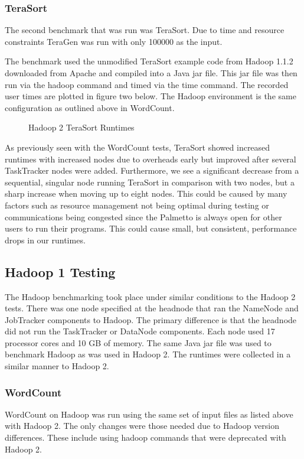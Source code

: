 \documentclass[conference]{IEEEtran}
\begin{document}
				\subsubsection{TeraSort}
					The second benchmark that was run was TeraSort. Due to time and resource constraints TeraGen was run with only 100000 as the input.

					The benchmark used the unmodified TeraSort example code from Hadoop 1.1.2 downloaded from Apache and compiled into a Java jar file. This jar file was then run via the hadoop command and timed via the time command. The recorded user times are plotted in figure two below. The Hadoop environment is the same configuration as outlined above in WordCount.
					\begin{figure}[h]
                   				\begin{center}
                       					
                        					\caption{Hadoop 2 TeraSort Runtimes}
                    				\end{center}
                  			\end{figure}

					As previously seen with the WordCount tests, TeraSort showed increased runtimes with increased nodes due to overheads early but improved after several TaskTracker nodes were added. Furthermore, we see a significant decrease from a sequential, singular node running TeraSort in comparison with two nodes, but a sharp increase when moving up to eight nodes. This could be caused by many factors such as resource management not being optimal during testing or communications being congested since the Palmetto is always open for other users to run their programs. This could cause small, but consistent, performance drops in our runtimes.
				\subsection{Hadoop 1 Testing}
					The Hadoop benchmarking took place under similar conditions to the Hadoop 2 tests. There was one node specified at the headnode that ran the NameNode and JobTracker components to Hadoop. The primary difference is that the headnode did not run the TaskTracker or DataNode components. Each node used 17 processor cores and 10 GB of memory. The same Java jar file was used to benchmark Hadoop as was used in Hadoop 2. The runtimes were collected in a similar manner to Hadoop 2.
					\subsubsection{WordCount}
					WordCount on Hadoop was run using the same set of input files as listed above with Hadoop 2. The only changes were those needed due to Hadoop version differences. These include using hadoop commands that were deprecated with Hadoop 2.
\end{document}
